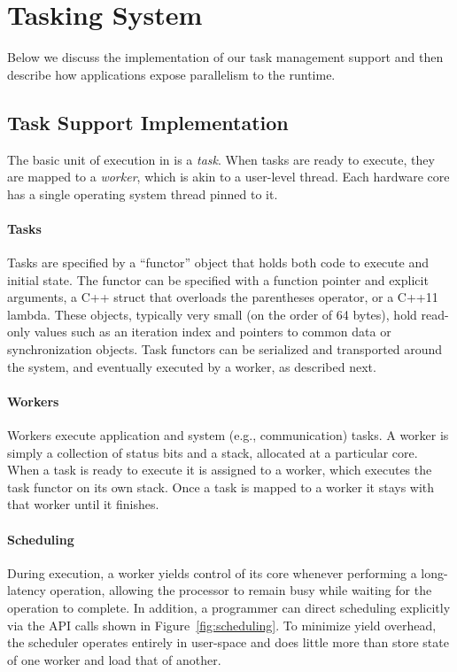 \section{Tasking System}

Below we discuss the implementation of our task management support and then
describe how applications expose parallelism to the \Grappa runtime.

\subsection{Task Support Implementation}

The basic unit of execution in \Grappa is a {\em task}. When tasks are ready to
execute, they are mapped to a {\em worker}, which is akin to a user-level
thread. Each hardware core has a single operating system thread pinned to it.

\paragraph{Tasks} 
Tasks are specified by a ``functor'' object that holds both code to execute and initial state. The functor can be specified with a function pointer and explicit arguments, a C++ struct that overloads the parentheses operator, or a C++11 lambda. These objects, typically very small (on the order of 64 bytes), hold read-only values such as an iteration index and pointers to common data or synchronization objects. Task functors can be serialized and transported around the system, and eventually executed by a worker, as described next.

\paragraph{Workers} Workers execute application and system (e.g.,
communication) tasks. A worker is simply a collection of status bits and a
stack, allocated at a particular core. When a task is ready to execute it
is assigned to a worker, which executes the task functor on its own stack. 
Once a task is mapped to a worker it stays with that worker until it finishes.

\paragraph{Scheduling} During execution, a worker yields control of its core
whenever performing a long-latency operation, allowing the processor to
remain busy while waiting for the operation to complete. In addition, a
programmer can direct scheduling explicitly via the \Grappa API calls shown in
Figure~\ref{fig:scheduling}. To minimize yield overhead, the \Grappa scheduler
operates entirely in user-space and does little more than store state of one
worker and load that of another.


